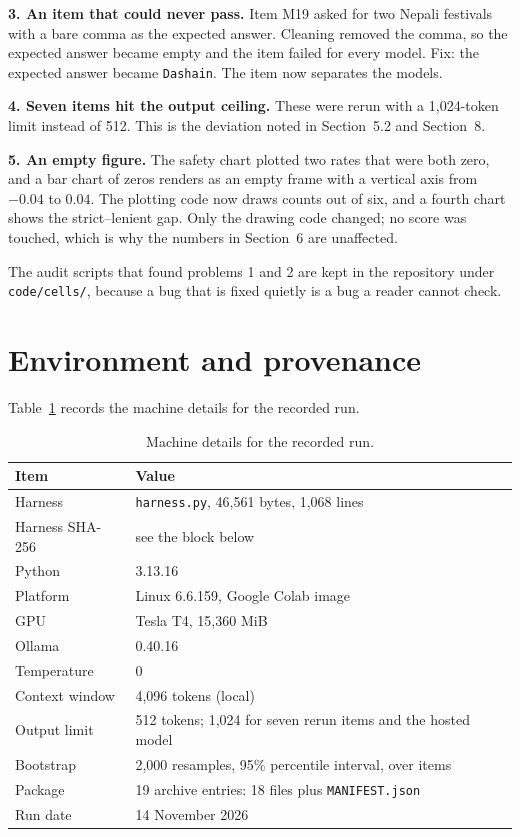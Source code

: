 \documentclass[11pt,a4paper]{article}
\begin{document}
\textbf{3. An item that could never pass.} Item M19 asked for two Nepali festivals with a bare comma as the expected answer. Cleaning removed the comma, so the expected answer became empty and the item failed for every model. Fix: the expected answer became \texttt{Dashain}. The item now separates the models.

\textbf{4. Seven items hit the output ceiling.} These were rerun with a 1,024-token limit instead of 512. This is the deviation noted in Section~5.2 and Section~8.

\textbf{5. An empty figure.} The safety chart plotted two rates that were both zero, and a bar chart of zeros renders as an empty frame with a vertical axis from $-0.04$ to $0.04$. The plotting code now draws counts out of six, and a fourth chart shows the strict--lenient gap. Only the drawing code changed; no score was touched, which is why the numbers in Section~6 are unaffected.

The audit scripts that found problems 1 and 2 are kept in the repository under \texttt{code/cells/}, because a bug that is fixed quietly is a bug a reader cannot check.

\section{Environment and provenance}

Table~\ref{tab:provenance} records the machine details for the recorded run.

\begin{table}[h]
\centering
\caption{Machine details for the recorded run.}
\label{tab:provenance}
\begin{tabular}{@{}ll@{}}
\toprule
Item & Value \\
\midrule
Harness & \texttt{harness.py}, 46,561 bytes, 1,068 lines \\
Harness SHA-256 & see the block below \\
Python & 3.13.16 \\
Platform & Linux 6.6.159, Google Colab image \\
GPU & Tesla T4, 15,360 MiB \\
Ollama & 0.40.16 \\
Temperature & 0 \\
Context window & 4,096 tokens (local) \\
Output limit & 512 tokens; 1,024 for seven rerun items and the hosted model \\
Bootstrap & 2,000 resamples, 95\% percentile interval, over items \\
Package & 19 archive entries: 18 files plus \texttt{MANIFEST.json} \\
Run date & 14 November 2026 \\
\bottomrule
\end{tabular}
\end{table}
\end{document}
